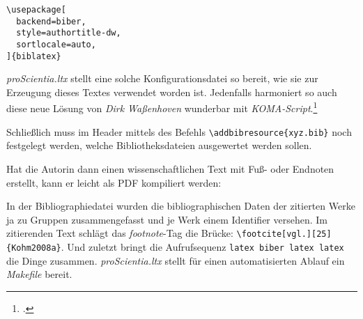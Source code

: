 \small
\begin{verbatim}
\usepackage[
  backend=biber,
  style=authortitle-dw,
  sortlocale=auto,
]{biblatex}

\end{verbatim}
\small

\emph{proScientia.ltx} stellt eine solche Konfigurationsdatei so bereit, wie sie zur Erzeugung dieses Textes verwendet worden ist. Jedenfalls harmoniert so auch diese neue Lösung von \emph{Dirk Waßenhoven} wunderbar mit
\emph{KOMA-Script}.\footcite[vgl.][]{Kohm2008a}

Schließlich muss im Header mittels des Befehls \texttt{\textbackslash{}addbibresource\{xyz.bib\}} noch festgelegt werden, welche Bibliotheksdateien ausgewertet werden sollen.

Hat die Autorin dann einen wissenschaftlichen Text mit Fuß- oder Endnoten erstellt, kann er leicht als PDF kompiliert werden:

In der Bibliographiedatei wurden die bibliographischen Daten der zitierten Werke ja zu Gruppen zusammengefasst und je Werk einem Identifier versehen. Im zitierenden Text schlägt das \emph{footnote}-Tag die Brücke: \texttt{\textbackslash{}footcite[vgl.][25]\{Kohm2008a\}}. Und zuletzt bringt die Aufrufsequenz \texttt{latex biber latex latex} die Dinge zusammen. \emph{proScientia.ltx} stellt für einen automatisierten Ablauf ein \emph{Makefile} bereit.
